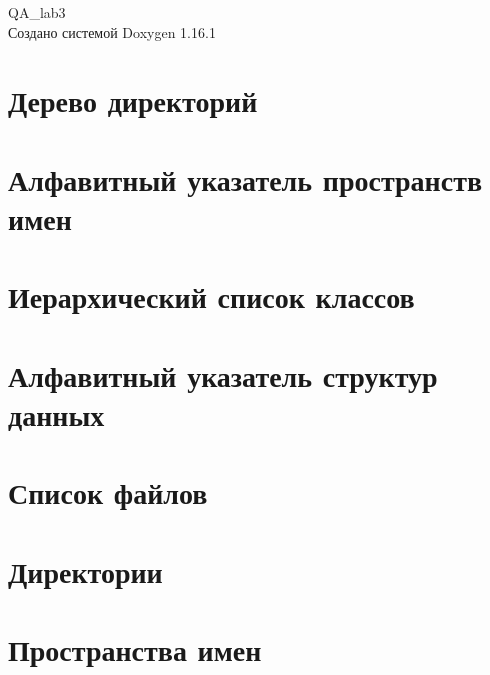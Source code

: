 \documentclass[twoside]{book}
\newcommand{\+}{\discretionary{\mbox{\scriptsize$\hookleftarrow$}}{}{}}
\newcommand{\clearemptydoublepage}{%
    \newpage{\pagestyle{empty}\cleardoublepage}%
  }
\begin{document}
  \raggedbottom
    \hypersetup{pageanchor=false,
                bookmarksnumbered=true,
                pdfencoding=unicode
               }
  \begin{titlepage}
  \vspace*{7cm}
  \begin{center}%
  {\Large QA\+\_\+lab3}\\
  \vspace*{1cm}
  {\large Создано системой Doxygen 1.16.1}\\
  \end{center}
  \end{titlepage}
  \clearemptydoublepage
  \tableofcontents
  \clearemptydoublepage
  \hypersetup{pageanchor=true}
\chapter{Дерево директорий}

\chapter{Алфавитный указатель пространств имен}

\chapter{Иерархический список классов}

\chapter{Алфавитный указатель структур данных}

\chapter{Список файлов}

\chapter{Директории}




\chapter{Пространства имен}

\end{document}
